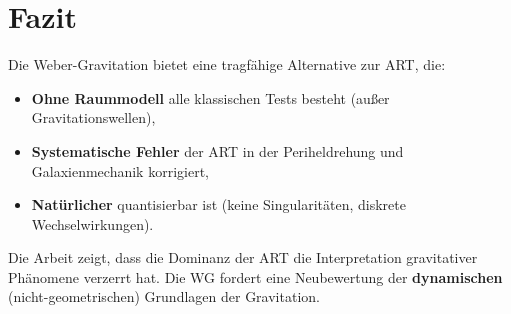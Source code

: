 \section{Fazit}
Die Weber-Gravitation bietet eine tragfähige Alternative zur ART, die:
\begin{itemize}
    \item \textbf{Ohne Raummodell} alle klassischen Tests besteht (außer Gravitationswellen),
    \item \textbf{Systematische Fehler} der ART in der Periheldrehung und Galaxienmechanik korrigiert,
    \item \textbf{Natürlicher} quantisierbar ist (keine Singularitäten, diskrete Wechselwirkungen).
\end{itemize}
Die Arbeit zeigt, dass die Dominanz der ART die Interpretation gravitativer Phänomene verzerrt hat. Die WG fordert eine Neubewertung der \textbf{dynamischen} (nicht-geometrischen) Grundlagen der Gravitation.

